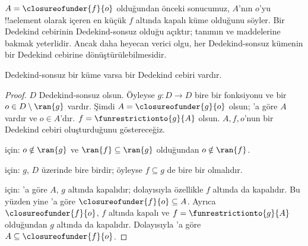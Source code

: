 $A=\closureofunder{f}{o}$ olduğundan önceki sonucumuz, $A$'nın $o$'yu
!!a{element} olarak içeren en küçük $f$ altında kapalı küme olduğunu söyler.
Bir Dedekind cebirinin Dedekind-sonsuz olduğu açıktır; tanımın
 ve  maddelerine bakmak yeterlidir.
Ancak daha heyecan verici olgu, her Dedekind-sonsuz kümenin bir Dedekind
cebirine dönüştürülebilmesidir.

\begin{thm}
Dedekind-sonsuz bir küme varsa bir Dedekind cebiri vardır.
\end{thm}

\begin{proof}
$D$ Dedekind-sonsuz olsun. Öyleyse $g\colon D\to D$ bire bir fonksiyonu ve
bir $o\in D\setminus\ran{g}$ vardır. Şimdi
$A=\closureofunder{g}{o}$ olsun; 'a göre $A$
vardır ve $o\in A$'dır. $f=\funrestrictionto{g}{A}$ olsun. $A,f,o$'nun bir
Dedekind cebiri oluşturduğunu göstereceğiz.

 için: $o\notin\ran{g}$ ve $\ran{f}\subseteq\ran{g}$
olduğundan $o\notin\ran{f}$.

 için: $g$, $D$ üzerinde bire birdir; öyleyse
$f\subseteq g$ de bire bir olmalıdır.

 için: 'a göre $A$, $g$ altında
kapalıdır; dolayısıyla özellikle $f$ altında da kapalıdır. Bu yüzden yine
'a göre $\closureofunder{f}{o}\subseteq A$.
Ayrıca $\closureofunder{f}{o}$, $f$ altında kapalı ve
$f=\funrestrictionto{g}{A}$ olduğundan $g$ altında da kapalıdır. Dolayısıyla
'a göre
$A\subseteq\closureofunder{f}{o}$.
\end{proof}

